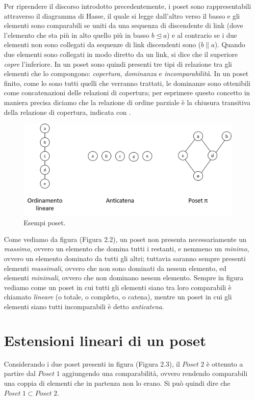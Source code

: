 \documentclass{report}
\begin{document}
Per riprendere il discorso introdotto precedentemente, i poset sono rappresentabili attraverso il diagramma di Hasse, il quale si legge dall'altro verso il basso e gli elementi sono comparabili se uniti da una sequenza di discendente di link (dove l'elemento che sta più in alto  quello più in basso $b\unlhd a$) e al contrario se i due elementi non sono collegati da sequenze di link discendenti sono  ($b\parallel a$). Quando due elementi sono collegati in modo diretto da un link, si dice che il superiore \textit{copre} l'inferiore. In un poset sono quindi presenti tre tipi di relazione tra gli elementi che lo compongono: \textit{copertura}, \textit{dominanza} e \textit{incomparabilità}. In un poset finito, come lo sono tutti quelli che verranno trattati, le dominanze sono ottenibili come concatenazioni delle relazioni di copertura; per esprimere questo concetto in maniera precisa diciamo che la relazione di ordine parziale è la chiusura transitiva della relazione di copertura, indicata con \prec.

\begin{figure}[H]
    \centering
    \includegraphics[width=12cm]{IMAGES/example_poset.png}
    \caption{Esempi poset.}
    \label{fig:roc}
\end{figure}

Come vediamo da figura (Figura 2.2), un poset non presenta necessariamente un \textit{massimo}, ovvero un elemento che domina tutti i restanti, e nemmeno un \textit{minimo}, ovvero un elemento dominato da tutti gli altri; tuttavia saranno sempre presenti elementi \textit{massimali}, ovvero che non sono dominati da nessun elemento, ed elementi \textit{minimali}, ovvero che non dominano nessun elemento. Sempre in figura vediamo come un poset in cui tutti gli elementi siano tra loro comparabili è chiamato \textit{lineare} (o totale, o completo, o catena), mentre un poset in cui gli elementi siano tutti incomparabili è detto \textit{anticatena}.

\section{Estensioni lineari di un poset}
Considerando i due poset presenti in figura (Figura 2.3), il $Poset\;2$ è ottenuto a partire dal $Poset\;1$ aggiungendo una comparabilità, ovvero rendendo comparabili una coppia di elementi che in partenza non lo erano. Si può quindi dire che $Poset\;1 \subset Poset\;2$.
\end{document}
